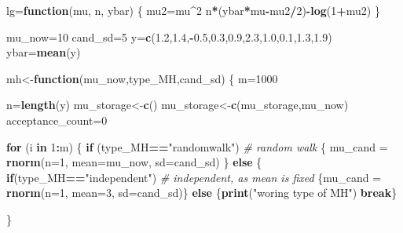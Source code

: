 \documentclass[]{book}
\newenvironment{Shaded}{\begin{snugshade}}{\end{snugshade}}
\newcommand{\KeywordTok}[1]{\textcolor[rgb]{0.13,0.29,0.53}{\textbf{#1}}}
\newcommand{\DataTypeTok}[1]{\textcolor[rgb]{0.13,0.29,0.53}{#1}}
\newcommand{\DecValTok}[1]{\textcolor[rgb]{0.00,0.00,0.81}{#1}}
\newcommand{\FloatTok}[1]{\textcolor[rgb]{0.00,0.00,0.81}{#1}}
\newcommand{\StringTok}[1]{\textcolor[rgb]{0.31,0.60,0.02}{#1}}
\newcommand{\CommentTok}[1]{\textcolor[rgb]{0.56,0.35,0.01}{\textit{#1}}}
\newcommand{\ControlFlowTok}[1]{\textcolor[rgb]{0.13,0.29,0.53}{\textbf{#1}}}
\newcommand{\OperatorTok}[1]{\textcolor[rgb]{0.81,0.36,0.00}{\textbf{#1}}}
\newcommand{\NormalTok}[1]{#1}
\begin{document}
\begin{Shaded}
\begin{Highlighting}[]
\NormalTok{lg=}\ControlFlowTok{function}\NormalTok{(mu, n, ybar)}
\NormalTok{\{}
\NormalTok{  mu2=mu}\OperatorTok{^}\DecValTok{2}
\NormalTok{  n}\OperatorTok{*}\NormalTok{(ybar}\OperatorTok{*}\NormalTok{mu}\OperatorTok{-}\NormalTok{mu2}\OperatorTok{/}\DecValTok{2}\NormalTok{)}\OperatorTok{-}\KeywordTok{log}\NormalTok{(}\DecValTok{1}\OperatorTok{+}\NormalTok{mu2)}
\NormalTok{\}}


\NormalTok{mu_now=}\DecValTok{10}
\NormalTok{cand_sd=}\DecValTok{5}
\NormalTok{y=}\KeywordTok{c}\NormalTok{(}\FloatTok{1.2}\NormalTok{,}\FloatTok{1.4}\NormalTok{,}\OperatorTok{-}\FloatTok{0.5}\NormalTok{,}\FloatTok{0.3}\NormalTok{,}\FloatTok{0.9}\NormalTok{,}\FloatTok{2.3}\NormalTok{,}\FloatTok{1.0}\NormalTok{,}\FloatTok{0.1}\NormalTok{,}\FloatTok{1.3}\NormalTok{,}\FloatTok{1.9}\NormalTok{)}
\NormalTok{ybar=}\KeywordTok{mean}\NormalTok{(y)}

\NormalTok{mh<-}\ControlFlowTok{function}\NormalTok{(mu_now,type_MH,cand_sd)}
\NormalTok{\{}
\NormalTok{m=}\DecValTok{1000}

\NormalTok{n=}\KeywordTok{length}\NormalTok{(y)}
\NormalTok{mu_storage<-}\KeywordTok{c}\NormalTok{()}
\NormalTok{mu_storage<-}\KeywordTok{c}\NormalTok{(mu_storage,mu_now)}
\NormalTok{acceptance_count=}\DecValTok{0}

\ControlFlowTok{for}\NormalTok{ (i }\ControlFlowTok{in} \DecValTok{1}\OperatorTok{:}\NormalTok{m)}
\NormalTok{\{}
  \ControlFlowTok{if}\NormalTok{ (type_MH}\OperatorTok{==}\StringTok{"randomwalk"}\NormalTok{)  }\CommentTok{# random walk}
\NormalTok{  \{}
\NormalTok{  mu_cand =}\StringTok{ }\KeywordTok{rnorm}\NormalTok{(}\DataTypeTok{n=}\DecValTok{1}\NormalTok{, }\DataTypeTok{mean=}\NormalTok{mu_now, }\DataTypeTok{sd=}\NormalTok{cand_sd)}
\NormalTok{  \}}
  \ControlFlowTok{else}
\NormalTok{  \{}
    \ControlFlowTok{if}\NormalTok{(type_MH}\OperatorTok{==}\StringTok{"independent"}\NormalTok{)  }\CommentTok{# independent, as mean is fixed}
\NormalTok{    \{mu_cand =}\StringTok{ }\KeywordTok{rnorm}\NormalTok{(}\DataTypeTok{n=}\DecValTok{1}\NormalTok{, }\DataTypeTok{mean=}\DecValTok{3}\NormalTok{, }\DataTypeTok{sd=}\NormalTok{cand_sd)\}}
    \ControlFlowTok{else}
\NormalTok{    \{}\KeywordTok{print}\NormalTok{(}\StringTok{"woring type of MH"}\NormalTok{)}
      \ControlFlowTok{break}\NormalTok{\}}
      
\NormalTok{  \}}
  

\end{Highlighting}
\end{Shaded}
\end{document}

